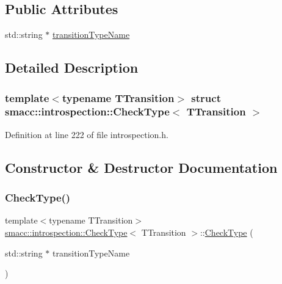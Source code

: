 \subsection*{Public Attributes}
\begin{DoxyCompactItemize}
\item 
std\+::string $\ast$ \hyperlink{structsmacc_1_1introspection_1_1CheckType_a0b356fd5975fa8f359f4e47f9ac8debf}{transition\+Type\+Name}
\end{DoxyCompactItemize}


\subsection{Detailed Description}
\subsubsection*{template$<$typename T\+Transition$>$\newline
struct smacc\+::introspection\+::\+Check\+Type$<$ T\+Transition $>$}



Definition at line 222 of file introspection.\+h.



\subsection{Constructor \& Destructor Documentation}
\mbox{\label{structsmacc_1_1introspection_1_1CheckType_a5f35a9f0375faf0e8e15088206d3692c}} 
\subsubsection{\texorpdfstring{Check\+Type()}{CheckType()}}
{\footnotesize\ttfamily template$<$typename T\+Transition$>$ \\
\hyperlink{structsmacc_1_1introspection_1_1CheckType}{smacc\+::introspection\+::\+Check\+Type}$<$ T\+Transition $>$\+::\hyperlink{structsmacc_1_1introspection_1_1CheckType}{Check\+Type} (\begin{DoxyParamCaption}\item[{std\+::string $\ast$}]{transition\+Type\+Name }\end{DoxyParamCaption})\hspace{0.3cm}{\ttfamily [inline]}}



